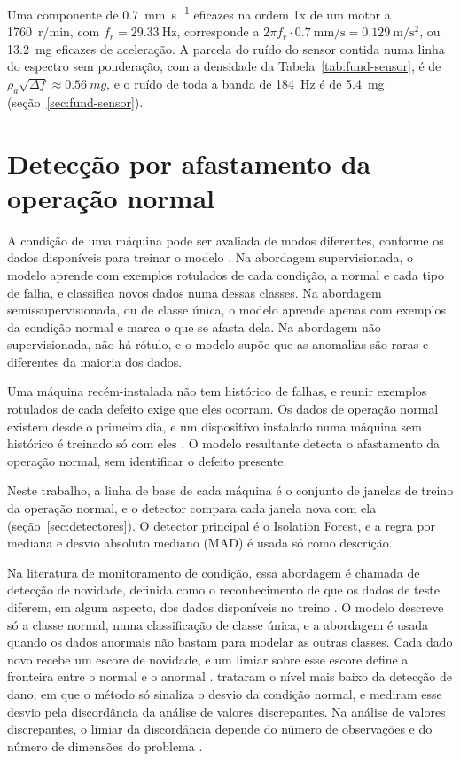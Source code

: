 Uma componente de \SI{0,7}{\milli\meter\per\second} eficazes na ordem 1x de um motor a \SI{1760}{r/min}, com $f_r = \SI{29,33}{\hertz}$, corresponde a $2\pi f_r \cdot \SI{0,7}{\milli\meter\per\second} = \SI{0,129}{\meter\per\second\squared}$, ou \SI{13,2}{mg} eficazes de aceleração. A parcela do ruído do sensor contida numa linha do espectro sem ponderação, com a densidade da Tabela~\ref{tab:fund-sensor}, é de $\rho_a\sqrt{\Delta f} \approx \SI{0,56}{mg}$, e o ruído de toda a banda de \SI{184}{\hertz} é de \SI{5,4}{mg} (seção~\ref{sec:fund-sensor}).

\section{Detecção por afastamento da operação normal}\label{sec:fund-deteccao}

A condição de uma máquina pode ser avaliada de modos diferentes, conforme os dados disponíveis para treinar o modelo \cite{chandola2009}. Na abordagem supervisionada, o modelo aprende com exemplos rotulados de cada condição, a normal e cada tipo de falha, e classifica novos dados numa dessas classes. Na abordagem semissupervisionada, ou de classe única, o modelo aprende apenas com exemplos da condição normal e marca o que se afasta dela. Na abordagem não supervisionada, não há rótulo, e o modelo supõe que as anomalias são raras e diferentes da maioria dos dados.

Uma máquina recém-instalada não tem histórico de falhas, e reunir exemplos rotulados de cada defeito exige que eles ocorram. Os dados de operação normal existem desde o primeiro dia, e um dispositivo instalado numa máquina sem histórico é treinado só com eles \cite{chandola2009}. O modelo resultante detecta o afastamento da operação normal, sem identificar o defeito presente.

Neste trabalho, a linha de base de cada máquina é o conjunto de janelas de treino da operação normal, e o detector compara cada janela nova com ela (seção~\ref{sec:detectores}). O detector principal é o Isolation Forest, e a regra por mediana e desvio absoluto mediano (MAD) é usada só como descrição.

Na literatura de monitoramento de condição, essa abordagem é chamada de detecção de novidade, definida como o reconhecimento de que os dados de teste diferem, em algum aspecto, dos dados disponíveis no treino \cite{pimentel2014}. O modelo descreve só a classe normal, numa classificação de classe única, e a abordagem é usada quando os dados anormais não bastam para modelar as outras classes. Cada dado novo recebe um escore de novidade, e um limiar sobre esse escore define a fronteira entre o normal e o anormal \cite{pimentel2014}.  trataram o nível mais baixo da detecção de dano, em que o método só sinaliza o desvio da condição normal, e mediram esse desvio pela discordância da análise de valores discrepantes. Na análise de valores discrepantes, o limiar da discordância depende do número de observações e do número de dimensões do problema \cite[p.~650]{worden2000}.

